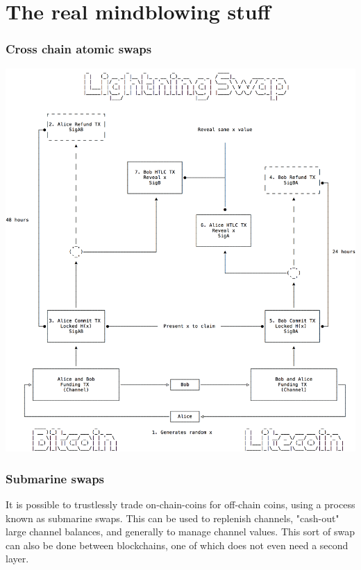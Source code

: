 \documentclass{beamer}
\begin{document}
\section{The real mindblowing stuff}
\begin{frame}
\frametitle{Cross chain atomic swaps}
\includegraphics[scale=0.2]{images/lightning_swap.png}
\end{frame}
\begin{frame}
\frametitle{Submarine swaps}
It is possible to trustlessly trade on-chain-coins for off-chain coins, using a process known as submarine swaps. This can be used to replenish channels, "cash-out" large channel balances, and generally to manage channel values. This sort of swap can also be done between blockchains, one of which does not even need a second layer.
\end{frame}
\end{document}
